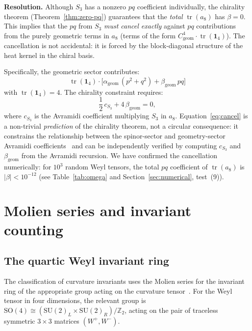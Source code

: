 \documentclass[12pt,a4paper]{article}
\theoremstyle{definition}
\theoremstyle{remark}
\newcommand{\tr}{\operatorname{tr}}
\begin{document}
\noindent\textbf{Resolution.}
Although $S_3$ has a nonzero $pq$ coefficient individually, the chirality
theorem (Theorem~\ref{thm:zero-pq}) guarantees that the \emph{total}
$\tr(a_8)$ has $\beta = 0$.  This implies that the $pq$ from $S_3$
\emph{must cancel exactly} against $pq$ contributions from the purely
geometric terms in $a_8$ (terms of the form
$C^4_{\mathrm{geom}} \cdot \tr(\mathbf{1}_4)$).  The cancellation is not
accidental: it is forced by the block-diagonal structure of the heat
kernel in the chiral basis.

Specifically, the geometric sector contributes:
\begin{equation}
  \tr(\mathbf{1}_4) \cdot \bigl[\alpha_{\mathrm{geom}}\,(p^2 + q^2)
  + \beta_{\mathrm{geom}}\,pq\bigr]
\end{equation}
with $\tr(\mathbf{1}_4) = 4$.  The chirality constraint requires:
\begin{equation}\label{eq:cancel}
  \frac{1}{2}\,c_{S_3} + 4\,\beta_{\mathrm{geom}} = 0,
\end{equation}
where $c_{S_3}$ is the Avramidi coefficient multiplying $S_3$ in $a_8$.
Equation~\eqref{eq:cancel} is a non-trivial \emph{prediction} of the
chirality theorem, not a circular consequence: it constrains the
relationship between the spinor-sector and geometry-sector Avramidi
coefficients~\cite{Avramidi:1999bm} and can be independently verified by
computing $c_{S_3}$ and $\beta_{\mathrm{geom}}$ from the Avramidi
recursion.  We have confirmed the cancellation numerically: for $10^3$
random Weyl tensors, the total $pq$ coefficient of $\tr(a_8)$ is
$|\beta| < 10^{-12}$ (see Table~\ref{tab:omega} and
Section~\ref{sec:numerical}, test~(9)).


\section{Molien series and invariant counting}
\label{sec:molien}

\subsection{The quartic Weyl invariant ring}

The classification of curvature invariants uses the Molien series for the
invariant ring of the appropriate group acting on the curvature
tensor~\cite{Fulling:1992vm}.  For the Weyl tensor in four dimensions, the
relevant group is
$\mathrm{SO}(4) \cong (\mathrm{SU}(2)_L \times \mathrm{SU}(2)_R)/\mathbb{Z}_2$,
acting on the pair of traceless symmetric $3 \times 3$ matrices $(W^+, W^-)$.
\end{document}
